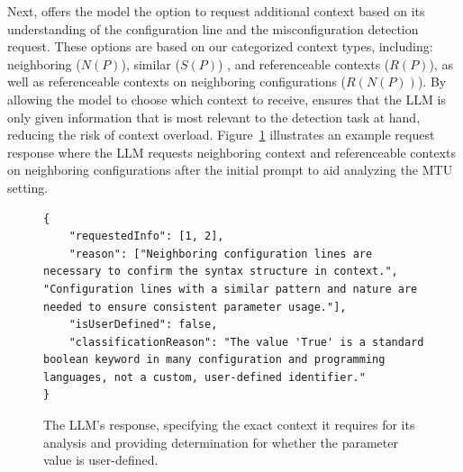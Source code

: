  Next, \sysname{} offers the model the option to request additional context based on its understanding of the configuration line and the misconfiguration detection request. These options are based on our categorized context types, including: neighboring (\( N(P) \)), similar (\(S(P) \)) , and referenceable contexts (\( R(P) \)), as well as referenceable contexts on neighboring configurations (\( R(N(P)) \)). By allowing the model to choose which context to receive, \sysname{} ensures that the LLM is only given information that is most relevant to the detection task at hand, reducing the risk of context overload. Figure~\ref{fig:step2_llm_request} illustrates an example request response
where the LLM requests neighboring context and referenceable contexts on neighboring configurations after the initial prompt to aid analyzing the MTU setting.



\begin{figure}[t]
    \centering
    \begin{mdframed}
    \begin{lstlisting}[basicstyle=\tiny\ttfamily, breaklines=true, postbreak=\mbox{\textcolor{red}{$\hookrightarrow$}\space}]
{
    "requestedInfo": [1, 2],
    "reason": ["Neighboring configuration lines are necessary to confirm the syntax structure in context.", "Configuration lines with a similar pattern and nature are needed to ensure consistent parameter usage."],
    "isUserDefined": false,
    "classificationReason": "The value 'True' is a standard boolean keyword in many configuration and programming languages, not a custom, user-defined identifier."
}
    \end{lstlisting}
    \end{mdframed}
    \caption{The LLM's response, specifying the exact context it requires for its analysis and providing determination for whether the parameter value is user-defined.}
    \label{fig:step2_llm_request}
\end{figure}


